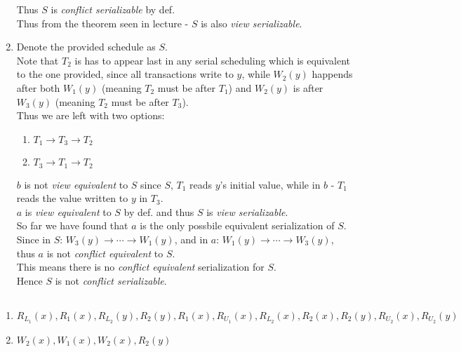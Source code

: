 \documentclass{article}
\begin{document}
\begin{enumerate}[label=\roman*.]
    Thus $S$ is \emph{conflict serializable} by def.\\
    Thus from the theorem seen in lecture - $S$ is also \emph{view serializable}.

    \item Denote the provided schedule as $S$.\\
    Note that $T_2$ is has to appear last in any serial scheduling
    which is equivalent to the one provided, since all transactions write to $y$,
    while $W_2(y)$ happends after both $W_1(y)$ (meaning $T_2$ must be after $T_1$) and
    $W_2(y)$ is after $W_3(y)$ (meaning $T_2$ must be after $T_3$).\\
    Thus we are left with two options:
    \begin{enumerate}
        \item $T_1\rightarrow T_3\rightarrow T_2$
        \item $T_3\rightarrow T_1\rightarrow T_2$
    \end{enumerate}
    $b$ is not \emph{view equivalent} to $S$ since
    $S$, $T_1$ reads $y$'s initial value, while in $b$ -
    $T_1$ reads the value written to $y$ in $T_3$.\\
    $a$ is \emph{view equivalent} to $S$ by def. and thus
    $S$ is \emph{view serializable}.\\
    So far we have found that $a$ is the only possbile equivalent serialization of
    $S$. Since in $S$: $W_3(y)\rightarrow\cdots\rightarrow W_1(y)$,
    and in $a$: $W_1(y)\rightarrow\cdots\rightarrow W_3(y)$,
    thus $a$ is not \emph{conflict equivalent} to $S$.\\
    This means there is no \emph{conflict equivalent} serialization for $S$.\\
    Hence $S$ is not \emph{conflict serializable}.
\end{enumerate}

\subsection{}
\begin{enumerate}[label=\roman*.]
    \item $R_{L_1}(x), R_{1}(x), R_{L_2}(y), R_{2}(y), R_{1}(x), R_{U_1}(x), R_{L_2}(x), R_{2}(x), R_{2}(y), R_{U_2}(x), R_{U_2}(y)$
    \item $W_2(x), W_1(x), W_2(x), R_2(y)$
\end{enumerate}
\end{document}
